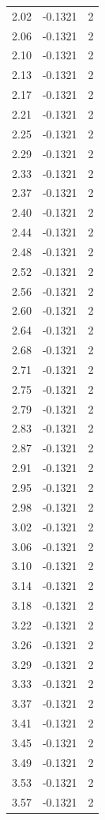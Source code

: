 \begin{longtable}{lrr}
  2.02 & -0.1321 & 2 \\
  2.06 & -0.1321 & 2 \\
  2.10 & -0.1321 & 2 \\
  2.13 & -0.1321 & 2 \\
  2.17 & -0.1321 & 2 \\
  2.21 & -0.1321 & 2 \\
  2.25 & -0.1321 & 2 \\
  2.29 & -0.1321 & 2 \\
  2.33 & -0.1321 & 2 \\
  2.37 & -0.1321 & 2 \\
  2.40 & -0.1321 & 2 \\
  2.44 & -0.1321 & 2 \\
  2.48 & -0.1321 & 2 \\
  2.52 & -0.1321 & 2 \\
  2.56 & -0.1321 & 2 \\
  2.60 & -0.1321 & 2 \\
  2.64 & -0.1321 & 2 \\
  2.68 & -0.1321 & 2 \\
  2.71 & -0.1321 & 2 \\
  2.75 & -0.1321 & 2 \\
  2.79 & -0.1321 & 2 \\
  2.83 & -0.1321 & 2 \\
  2.87 & -0.1321 & 2 \\
  2.91 & -0.1321 & 2 \\
  2.95 & -0.1321 & 2 \\
  2.98 & -0.1321 & 2 \\
  3.02 & -0.1321 & 2 \\
  3.06 & -0.1321 & 2 \\
  3.10 & -0.1321 & 2 \\
  3.14 & -0.1321 & 2 \\
  3.18 & -0.1321 & 2 \\
  3.22 & -0.1321 & 2 \\
  3.26 & -0.1321 & 2 \\
  3.29 & -0.1321 & 2 \\
  3.33 & -0.1321 & 2 \\
  3.37 & -0.1321 & 2 \\
  3.41 & -0.1321 & 2 \\
  3.45 & -0.1321 & 2 \\
  3.49 & -0.1321 & 2 \\
  3.53 & -0.1321 & 2 \\
  3.57 & -0.1321 & 2 \\

\end{longtable}
